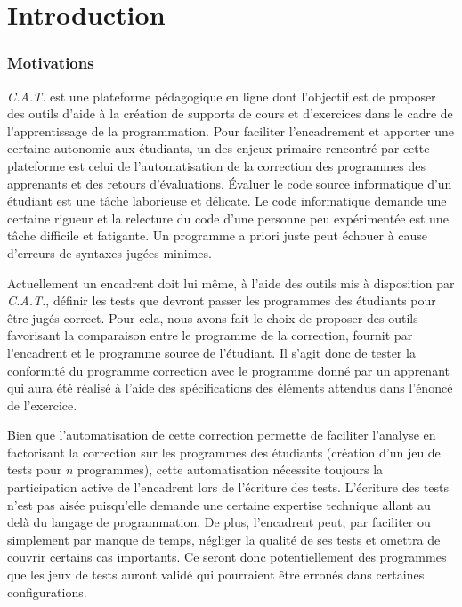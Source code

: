 \chapter*{Introduction}

\pagestyle{headings}

\subsection*{Motivations}
\textit{C.A.T.} est une plateforme pédagogique en ligne dont l'objectif est de proposer des outils d'aide à la création de supports de cours et d'exercices dans le cadre de l'apprentissage de la programmation. 
Pour faciliter l'encadrement et apporter une certaine autonomie aux étudiants, un des enjeux primaire rencontré par cette plateforme est celui de l'automatisation de la correction des programmes des apprenants et des retours d'évaluations.
Évaluer le code source informatique d'un étudiant est une tâche laborieuse et délicate. Le code informatique demande une certaine rigueur et la relecture du code d'une personne peu expérimentée est une tâche difficile et fatigante. Un programme a priori juste peut échouer à cause d'erreurs de syntaxes jugées minimes.

Actuellement un encadrent doit lui même, à l'aide des outils mis à disposition par \textit{C.A.T.}, définir les tests que devront passer les programmes des étudiants pour être jugés correct. Pour cela, nous avons fait le choix de proposer des outils favorisant la comparaison entre le programme de la correction, fournit par l'encadrent et le programme source de l'étudiant.
Il s'agit donc de tester la conformité du programme correction avec le programme donné par un apprenant qui aura été réalisé à l'aide des spécifications des éléments attendus dans l'énoncé de l'exercice.

Bien que l'automatisation de cette correction permette de faciliter l'analyse en factorisant la correction sur les programmes des étudiants (création d'un jeu de tests pour $n$ programmes), cette automatisation nécessite toujours la participation active de l'encadrent lors de l'écriture des tests. L'écriture des tests n'est pas aisée puisqu'elle demande une certaine expertise technique allant au delà du langage de programmation. 
De plus, l'encadrent peut, par faciliter ou simplement par manque de temps, négliger la qualité de ses tests et omettra de couvrir certains cas importants. Ce seront donc potentiellement des programmes que les jeux de tests auront validé qui pourraient être erronés dans certaines configurations. 

